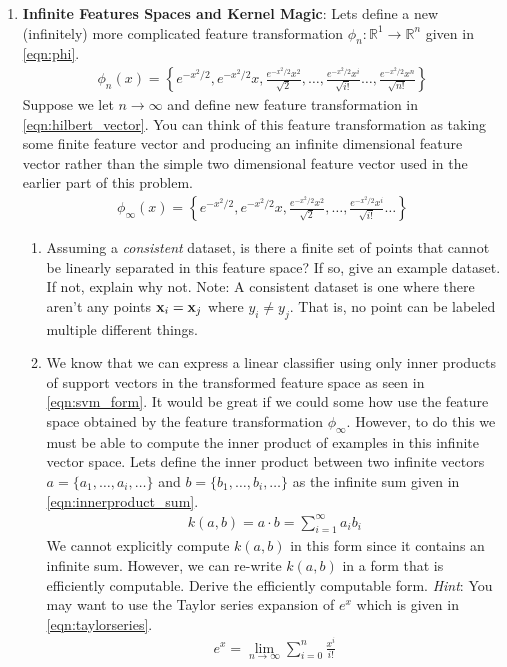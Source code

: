 \begin{enumerate}
\item \textbf{Infinite Features Spaces and Kernel Magic}: Lets define
  a new (infinitely) more complicated feature transformation
  $\phi_n:\mathbb{R}^1 \rightarrow \mathbb{R}^n$ given in
  \autoref{eqn:phi}.
  \begin{eqnarray}
    \phi_n(x) = \left\{ e^{-x^2/2}, e^{-x^2/2} x, \frac{e^{-x^2/2}x^2}{\sqrt{2}},
    \ldots,
    \frac{e^{-x^2/2}x^i}{\sqrt{i!}}
    \ldots,
    \frac{e^{-x^2/2}x^n}{\sqrt{n!}}
    \right\}
    \label{eqn:phi}
  \end{eqnarray}
  Suppose we let $n \rightarrow \infty$ and define new feature
  transformation in \autoref{eqn:hilbert_vector}.  You can think of
  this feature transformation as taking some finite feature vector and
  producing an infinite dimensional feature vector rather than the
  simple two dimensional feature vector used in the earlier part of
  this problem.
  \begin{eqnarray}
    \phi_{\infty}(x) = \left\{ e^{-x^2/2}, e^{-x^2/2} x,
    \frac{e^{-x^2/2}x^2}{\sqrt{2}},
    \ldots,
    \frac{e^{-x^2/2}x^i}{\sqrt{i!}}
    \ldots
    \right\}
    \label{eqn:hilbert_vector}
  \end{eqnarray}
  
  \begin{enumerate}
  \item {} Assuming a \emph{consistent} dataset, is there a
    finite set of points that cannot be linearly separated in this
    feature space?  If so, give an example dataset.  If not, explain
    why not.  Note: A consistent dataset is one where there aren't any
    points $\mathbf{x}_i = \mathbf{x}_j$ where $y_i \ne y_j$.  That is, no point can
    be labeled multiple different things.


  \item {} We know that we can express a linear classifier
    using only inner products of support vectors in the transformed
    feature space as seen in \autoref{eqn:svm_form}.  It would be
    great if we could some how use the feature space obtained by the
    feature transformation $\phi_{\infty}$.  However, to do this we
    must be able to compute the inner product of examples in this
    infinite vector space.  Lets define the inner product between two
    infinite vectors $a=\{a_1,\ldots,a_i,\ldots\}$ and
    $b=\{b_1,\ldots,b_i,\ldots\}$ as the infinite sum given in
    \autoref{eqn:innerproduct_sum}.
    \begin{eqnarray}
      k(a,b) = a \cdot b = \sum_{i=1}^{\infty} a_i b_i
      \label{eqn:innerproduct_sum}
    \end{eqnarray}
    We cannot explicitly compute $k(a,b)$ in this form since it
    contains an infinite sum.  However, we can re-write $k(a,b)$ in a
    form that is efficiently computable.  Derive the efficiently
    computable form.  \emph{Hint}: You may want to use the Taylor
    series expansion of $e^x$ which is given in
    \autoref{eqn:taylorseries}.
    \begin{eqnarray}
      e^{x}=\lim_{n \rightarrow \infty} \sum_{i=0}^n \frac{x^i}{i!}
      \label{eqn:taylorseries}
    \end{eqnarray}



\end{enumerate}
\end{enumerate}
